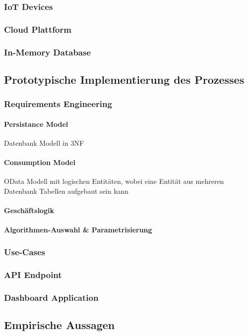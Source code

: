 \subsubsection{IoT Devices}

\subsubsection{Cloud Plattform}

\subsubsection{In-Memory Database}

\subsection{Prototypische Implementierung des Prozesses}

\subsubsection{Requirements Engineering}

\paragraph{Persistance Model}
Datenbank Modell in 3NF\\

\paragraph{Consumption Model}
OData Modell mit logischen Entitäten, wobei eine Entität aus mehreren Datenbank Tabellen aufgebaut sein kann\\

\paragraph{Geschäftslogik}

\paragraph{Algorithmen-Auswahl \& Parametrisierung}

\subsubsection{Use-Cases}

\subsubsection{API Endpoint}

\subsubsection{Dashboard Application}

\subsection{Empirische Aussagen}

\newpage